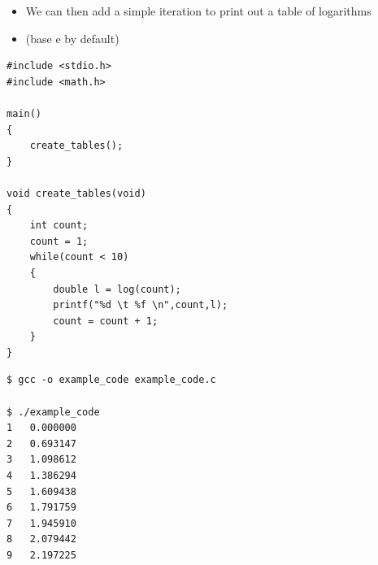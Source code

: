 \documentclass{beamer}
\begin{document}
\begin{frame}
\begin{itemize}
\item We can then add a simple iteration to print out a table of logarithms
\item (base e by default) 
\end{itemize}
\end{frame}

\begin{frame}[fragile]
\begin{block}{}
\begin{lstlisting}
#include <stdio.h>
#include <math.h>

main() 
{
    create_tables();
}

void create_tables(void)
{
    int count;
    count = 1;
    while(count < 10)
    {
        double l = log(count);
        printf("%d \t %f \n",count,l);
        count = count + 1;
    }
}
\end{lstlisting}
\end{block}
\end{frame}

\begin{frame}[fragile]
\begin{block}{}
\begin{lstlisting}
$ gcc -o example_code example_code.c

$ ./example_code 
1	0.000000
2	0.693147
3	1.098612
4	1.386294
5	1.609438
6	1.791759
7	1.945910
8	2.079442
9	2.197225

\end{lstlisting}
\end{block}
\end{frame}
\end{document}
